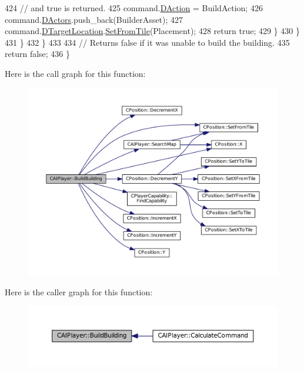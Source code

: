 \begin{DoxyCode}
424                     \textcolor{comment}{// and true is returned.}
425                     command.\hyperlink{structSPlayerCommandRequest_a80897bbccf2c4e0b148a7aa815a926c6}{DAction} = BuildAction;
426                     command.\hyperlink{structSPlayerCommandRequest_aa37fc01519676345703d78b9f573894a}{DActors}.push\_back(BuilderAsset);
427                     command.\hyperlink{structSPlayerCommandRequest_a701702b94ca2fd2738e95ef6711dd41a}{DTargetLocation}.\hyperlink{classCPosition_a46994e6a8b8e3b4237edd7259ad844b6}{SetFromTile}(Placement);
428                     \textcolor{keywordflow}{return} \textcolor{keyword}{true};
429                 \}
430             \}
431         \}
432     \}
433 
434     \textcolor{comment}{// Returns false if it was unable to build the building.}
435     \textcolor{keywordflow}{return} \textcolor{keyword}{false};
436 \}
\end{DoxyCode}
Here is the call graph for this function\+:\nopagebreak
\begin{figure}[H]
\begin{center}
\leavevmode
\includegraphics[width=350pt]{classCAIPlayer_a2ff5263cbaa6bfc62ffec4dbce87ba88_cgraph}
\end{center}
\end{figure}
Here is the caller graph for this function\+:\nopagebreak
\begin{figure}[H]
\begin{center}
\leavevmode
\includegraphics[width=350pt]{classCAIPlayer_a2ff5263cbaa6bfc62ffec4dbce87ba88_icgraph}
\end{center}
\end{figure}
\hypertarget{classCAIPlayer_a41cdefbe14210fb70b793a32778c5141}{}\label{classCAIPlayer_a41cdefbe14210fb70b793a32778c5141} 
